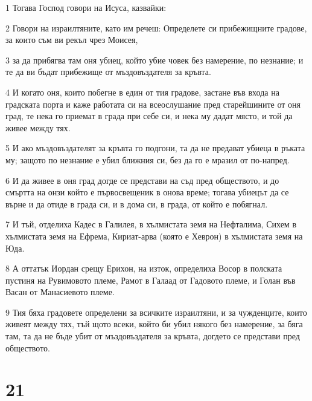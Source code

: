 \par 1 Тогава Господ говори на Исуса, казвайки:
\par 2 Говори на израилтяните, като им речеш: Определете си прибежищните градове, за които съм ви рекъл чрез Моисея,
\par 3 за да прибягва там оня убиец, който убие човек без намерение, по незнание; и те да ви бъдат прибежище от мъздовъздателя за кръвта.
\par 4 И когато оня, които побегне в един от тия градове, застане във входа на градската порта и каже работата си на всеослушание пред старейшините от оня град, те нека го приемат в града при себе си, и нека му дадат място, и той да живее между тях.
\par 5 И ако мъздовъздателят за кръвта го подгони, та да не предават убиеца в ръката му; защото по незнание е убил ближния си, без да го е мразил от по-напред.
\par 6 И да живее в оня град догде се представи на съд пред обществото, и до смъртта на онзи който е първосвещеник в онова време; тогава убиецът да се върне и да отиде в града си, и в дома си, в града, от който е побягнал.
\par 7 И тъй, отделиха Кадес в Галилея, в хълмистата земя на Нефталима, Сихем в хълмистата земя на Ефрема, Кириат-арва (която е Хеврон) в хълмистата земя на Юда.
\par 8 А оттатък Иордан срещу Ерихон, на изток, определиха Восор в полската пустиня на Рувимовото племе, Рамот в Галаад от Гадовото племе, и Голан във Васан от Манасиевото племе.
\par 9 Тия бяха градовете определени за всичките израилтяни, и за чужденците, които живеят между тях, тъй щото всеки, който би убил някого без намерение, за бяга там, та да не бъде убит от мъздовъздателя за кръвта, догдето се представи пред обществото.

\chapter{21}

